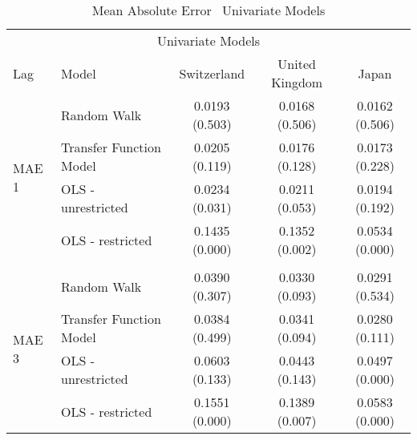 \begin{table}[!ht] %
  \centering
    \caption{Mean Absolute Error \textendash \ Univariate Models}
  \begin{tabular}{llccc} %
    \toprule
    \multicolumn{5}{c}{Univariate Models}                      \\
    \cmidrule(r){1-5}
    Lag                           &   Model                                     &Switzerland  & United Kingdom  & Japan\\
    \midrule
    \multirow{4}{*}{MAE 1}        & \multicolumn{1}{l}{Random Walk}             &   0.0193 (0.503) & 0.0168 (0.506) & 0.0162 (0.506)\\
                                  & \multicolumn{1}{l}{Transfer Function Model} &   0.0205 (0.119) & 0.0176 (0.128) & 0.0173 (0.228)\\ 
                                  & \multicolumn{1}{l}{OLS - unrestricted}      &   0.0234 (0.031) & 0.0211 (0.053) & 0.0194 (0.192)\\
                                  & \multicolumn{1}{l}{OLS - restricted}        &   0.1435 (0.000) & 0.1352 (0.002) & 0.0534 (0.000)\\
    \\
    \multirow{4}{*}{MAE 3}        & \multicolumn{1}{l}{Random Walk}             &   0.0390 (0.307) & 0.0330 (0.093) & 0.0291 (0.534)\\ 
                                  & \multicolumn{1}{l}{Transfer Function Model} &   0.0384 (0.499) & 0.0341 (0.094) & 0.0280 (0.111)\\
                                  & \multicolumn{1}{l}{OLS - unrestricted}      &   0.0603 (0.133) & 0.0443 (0.143) & 0.0497 (0.000)\\
                                  & \multicolumn{1}{l}{OLS - restricted}        &   0.1551 (0.000) & 0.1389 (0.007) & 0.0583 (0.000)\\
                                                                             

\end{tabular}
\end{table}
